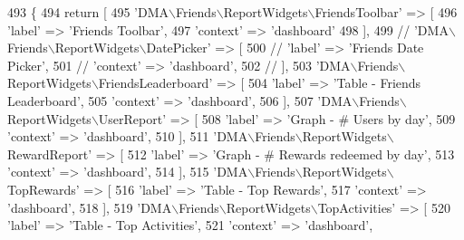 \begin{DoxyCode}
493     \{   
494         \textcolor{keywordflow}{return} [
495             \textcolor{stringliteral}{'DMA\(\backslash\)Friends\(\backslash\)ReportWidgets\(\backslash\)FriendsToolbar'} => [
496                 \textcolor{stringliteral}{'label'}     => \textcolor{stringliteral}{'Friends Toolbar'},
497                 \textcolor{stringliteral}{'context'}   => \textcolor{stringliteral}{'dashboard'}
498             ],
499             \textcolor{comment}{// 'DMA\(\backslash\)Friends\(\backslash\)ReportWidgets\(\backslash\)DatePicker' => [}
500             \textcolor{comment}{//     'label'     => 'Friends Date Picker',}
501             \textcolor{comment}{//     'context'   => 'dashboard',}
502             \textcolor{comment}{// ],}
503             \textcolor{stringliteral}{'DMA\(\backslash\)Friends\(\backslash\)ReportWidgets\(\backslash\)FriendsLeaderboard'} => [
504                 \textcolor{stringliteral}{'label'}     => \textcolor{stringliteral}{'Table - Friends Leaderboard'},
505                 \textcolor{stringliteral}{'context'}   => \textcolor{stringliteral}{'dashboard'},
506             ],
507             \textcolor{stringliteral}{'DMA\(\backslash\)Friends\(\backslash\)ReportWidgets\(\backslash\)UserReport'} => [
508                 \textcolor{stringliteral}{'label'}     => \textcolor{stringliteral}{'Graph - # Users by day'},
509                 \textcolor{stringliteral}{'context'}   => \textcolor{stringliteral}{'dashboard'},
510             ],
511             \textcolor{stringliteral}{'DMA\(\backslash\)Friends\(\backslash\)ReportWidgets\(\backslash\)RewardReport'} => [
512                 \textcolor{stringliteral}{'label'}     => \textcolor{stringliteral}{'Graph - # Rewards redeemed by day'},
513                 \textcolor{stringliteral}{'context'}   => \textcolor{stringliteral}{'dashboard'},
514             ],
515             \textcolor{stringliteral}{'DMA\(\backslash\)Friends\(\backslash\)ReportWidgets\(\backslash\)TopRewards'} => [
516                 \textcolor{stringliteral}{'label'}     => \textcolor{stringliteral}{'Table - Top Rewards'},
517                 \textcolor{stringliteral}{'context'}   => \textcolor{stringliteral}{'dashboard'},
518             ],
519             \textcolor{stringliteral}{'DMA\(\backslash\)Friends\(\backslash\)ReportWidgets\(\backslash\)TopActivities'} => [
520                 \textcolor{stringliteral}{'label'}     => \textcolor{stringliteral}{'Table - Top Activities'},
521                 \textcolor{stringliteral}{'context'}   => \textcolor{stringliteral}{'dashboard'},

\end{DoxyCode}
